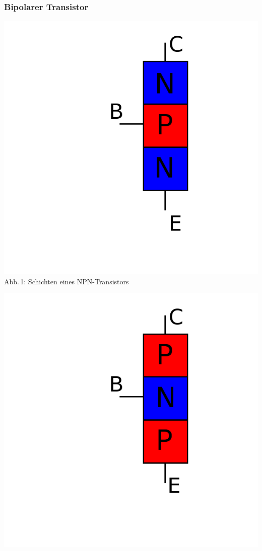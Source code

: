 \begin{frame}
\frametitle{Bipolarer Transistor}
\begin{minipage}{0.4\textwidth}
	\includegraphics[width=\textwidth,height=.5\textheight,keepaspectratio]{a06/NPN_hlb.png}\\
	{\tiny Abb.\,1: Schichten eines NPN-Transistors}
\end{minipage}
\hspace{0.5cm}
\begin{minipage}{0.4\textwidth}
	\includegraphics[width=\textwidth,height=.5\textheight,keepaspectratio]{a06/PNP_hlb.png}\\

\end{minipage}
\end{frame}
